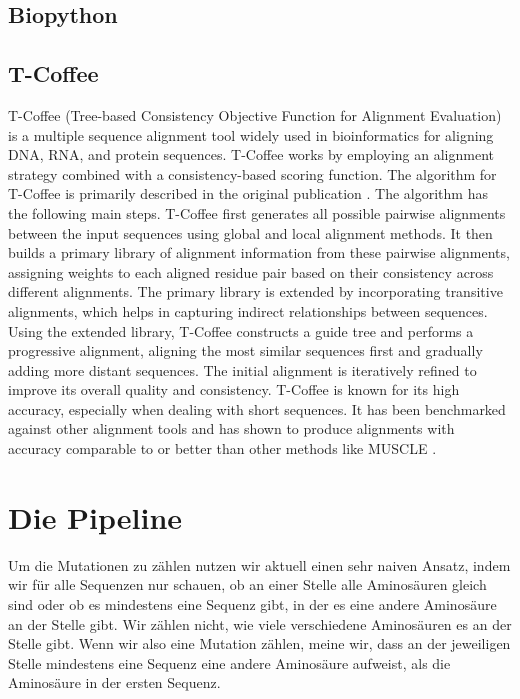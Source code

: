 \documentclass[german,version-2022-01]{uzl-thesis}
\begin{document}
\section{Biopython}

\section{T-Coffee}
T-Coffee (Tree-based Consistency Objective Function for Alignment Evaluation) is a multiple sequence alignment tool widely used in bioinformatics for aligning DNA, RNA, and protein sequences. T-Coffee works by employing an alignment strategy combined with a consistency-based scoring function. The algorithm for T-Coffee is primarily described in the original publication  \cite{poirot_tcoffeeigs_2003}. The algorithm has the following main steps. T-Coffee first generates all possible pairwise alignments between the input sequences using global and local alignment methods. It then builds a primary library of alignment information from these pairwise alignments, assigning weights to each aligned residue pair based on their consistency across different alignments. The primary library is extended by incorporating transitive alignments, which helps in capturing indirect relationships between sequences. Using the extended library, T-Coffee constructs a guide tree and performs a progressive alignment, aligning the most similar sequences first and gradually adding more distant sequences. The initial alignment is iteratively refined to improve its overall quality and consistency.
T-Coffee is known for its high accuracy, especially when dealing with short sequences. It has been benchmarked against other alignment tools and has shown to produce alignments with accuracy comparable to or better than other methods like MUSCLE \cite{Edgar2004MUSCLEL}.

\chapter{Die Pipeline}
Um die Mutationen zu z\"ahlen nutzen wir aktuell einen sehr naiven Ansatz, indem wir f\"ur alle Sequenzen nur schauen, ob an einer Stelle alle Aminos\"auren gleich sind oder ob es mindestens eine Sequenz gibt, in der es eine andere Aminos\"aure an der Stelle gibt. Wir z\"ahlen nicht, wie viele verschiedene Aminos\"auren es an der Stelle gibt. Wenn wir also eine Mutation z\"ahlen, meine wir, dass an der jeweiligen Stelle mindestens eine Sequenz eine andere Aminos\"aure aufweist, als die Aminos\"aure in der ersten Sequenz. 
\end{document}
